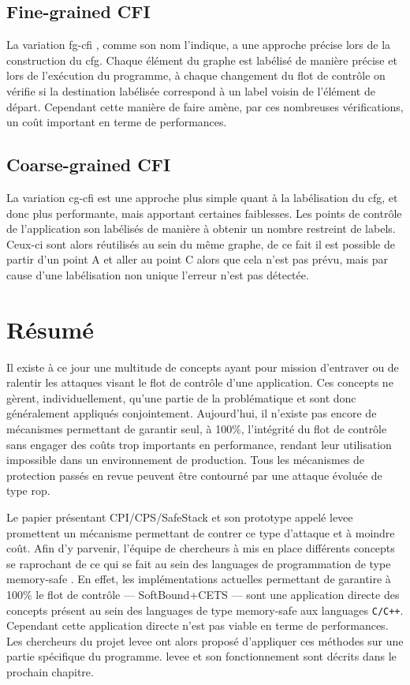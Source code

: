 \subsection{\og Fine-grained CFI \fg}

La variation \og \gls{fg-cfi} \fg \cite{FineCFI, FineCFIKernel}, comme son nom l'indique, a une approche précise lors de la construction du \gls{cfg}. Chaque élément du graphe est labélisé de manière précise et lors de l'exécution du programme, à chaque changement du flot de contrôle on vérifie si la destination labélisée correspond à un label voisin de l'élément de départ. Cependant cette manière de faire amène, par ces nombreuses vérifications, un coût important en terme de performances.

\subsection{\og Coarse-grained CFI \fg}

La variation \og \gls{cg-cfi} \fg est une approche plus simple quant à la labélisation du \gls{cfg},  et donc plus performante, mais apportant certaines faiblesses. Les points de contrôle de l'application son labélisés de manière à obtenir un nombre restreint de labels. Ceux-ci sont alors réutilisés au sein du même graphe, de ce fait il est possible de partir d'un point A et aller au point C alors que cela n'est pas prévu, mais par cause d'une labélisation non unique l'erreur n'est pas détectée.

\newpage

\section{Résumé}

Il existe à ce jour une multitude de concepts ayant pour mission d'entraver ou de ralentir les attaques visant le flot de contrôle d'une application. Ces concepts ne gèrent, individuellement, qu'une partie de la problématique et sont donc généralement appliqués conjointement. Aujourd'hui, il n'existe pas encore de mécanismes permettant de garantir seul, à 100\%, l'intégrité du flot de contrôle sans engager des coûts trop importants en performance, rendant leur utilisation impossible dans un environnement de production. Tous les mécanismes de protection passés en revue peuvent être contourné par une attaque évoluée de type \gls{rop}.

Le papier présentant CPI/CPS/SafeStack \cite{CPIPaper} et son prototype appelé \gls{levee} promettent un mécanisme permettant de contrer ce type d'attaque et à moindre coût. Afin d'y parvenir, l'équipe de chercheurs à mis en place différents concepts se raprochant de ce qui se fait au sein des languages de programmation de type \og memory-safe \fg. En effet, les implémentations actuelles permettant de garantire à 100\% le flot de contrôle --- SoftBound+CETS --- sont une application directe des concepts présent au sein des languages de type \og memory-safe \fg aux languages \texttt{C/C++}. Cependant cette application directe n'est pas viable en terme de performances. Les chercheurs du projet \gls{levee} ont alors proposé d'appliquer ces méthodes sur une partie spécifique du programme.
\gls{levee} et son fonctionnement sont décrits dans le prochain chapitre.
